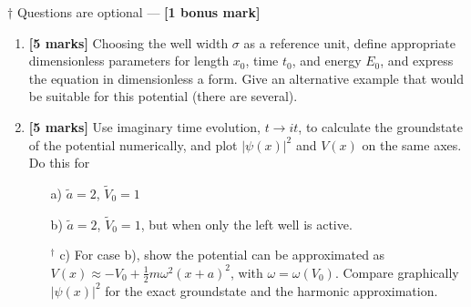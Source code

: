 \documentclass[11pt]{article}
\begin{document}
{\footnotesize{$\dagger$ Questions are optional  --- \textbf{[1 bonus mark]}}}
\begin{enumerate}
\subsection*{Part A }
\item \textbf{[5 marks]} Choosing the well width $\sigma$ as a reference unit, define appropriate dimensionless parameters for length $x_0$, time $t_0$,  and energy $E_0$, and express the equation in dimensionless a form. Give an alternative example that would be suitable for this potential (there are several).

\item \textbf{[5 marks]}  Use imaginary time evolution, $t \rightarrow i t$, to calculate the groundstate of the potential numerically, and plot $|\psi(x)|^2$ and $V(x)$ on the same axes.  Do this for 
\begin{itemize}
\item[a)] $\tilde a = 2$, $\tilde V_0 = 1$
\item[b)] $\tilde a =2$, $\tilde V_0 =1$, but when only the left well is active.
\item[$^\dagger$ c)]  For case b), show  the potential can be approximated as $V(x) \approx -V_0 + \tfrac{1}{2} m \omega^2 (x+a)^2$, with $\omega = \omega(V_0)$. Compare graphically $|\psi(x)|^2$ for the exact groundstate and the harmonic approximation.
\end{itemize}




\end{enumerate}
\end{document}
